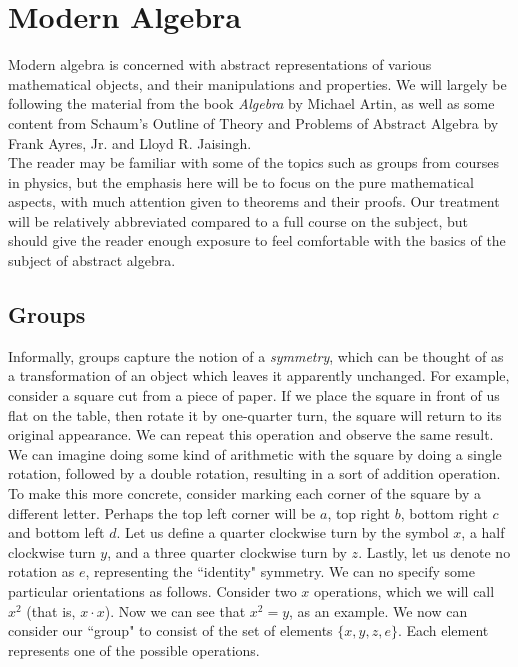 \chapter{Modern Algebra}

Modern algebra is concerned with abstract representations of various mathematical objects, and their manipulations and properties.  We will largely be following the material from the book \textit{Algebra} by Michael Artin, as well as some content from Schaum's Outline of Theory and Problems of Abstract Algebra by Frank Ayres, Jr. and Lloyd R. Jaisingh.\\

The reader may be familiar with some of the topics such as groups from courses in physics, but the emphasis here will be to focus on the pure mathematical aspects, with much attention given to theorems and their proofs.  Our treatment will be relatively abbreviated compared to a full course on the subject, but should give the reader enough exposure to feel comfortable with the basics of the subject of abstract algebra.

\section{Groups}

Informally, groups capture the notion of a \textit{symmetry}, which can be thought of as a transformation of an object which leaves it apparently unchanged.  For example, consider a square cut from a piece of paper.  If we place the square in front of us flat on the table, then rotate it by one-quarter turn, the square will return to its original appearance.  We can repeat this operation and observe the same result.  We can imagine doing some kind of arithmetic with the square by doing a single rotation, followed by a double rotation, resulting in a sort of addition operation.\\  

To make this more concrete, consider marking each corner of the square by a different letter.  Perhaps the top left corner will be $a$, top right $b$, bottom right $c$ and bottom left $d$.  Let us define a quarter clockwise turn by the symbol $x$, a half clockwise turn $y$, and a three quarter clockwise turn by $z$.  Lastly, let us denote no rotation as $e$, representing the ``identity" symmetry.  We can no specify some particular orientations as follows.  Consider two $x$ operations, which we will call $x^{2}$ (that is, $x \cdot x$).  Now we can see that $x^{2}=y$, as an example.  We now can consider our ``group" to consist of the set of elements $\{x,y,z,e\}$.  Each element represents one of the possible operations.\\

